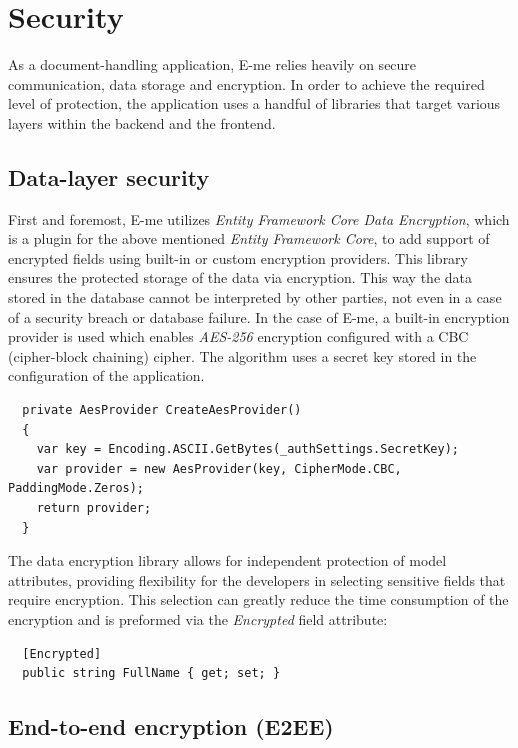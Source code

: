 \section{Security}

As a document-handling application, E-me relies heavily on secure communication, data storage and encryption.
In order to achieve the required level of protection, the application uses a handful of libraries that target various layers within the backend and the frontend.

\subsection{Data-layer security}

First and foremost, E-me utilizes \emph{Entity Framework Core Data Encryption}, which is a plugin for the above mentioned \emph{Entity Framework Core},
 to add support of encrypted fields using built-in or custom encryption providers.
This library ensures the protected storage of the data via encryption.
This way the data stored in the database cannot be interpreted by other parties, not even in a case of a security breach or database failure.
In the case of E-me, a built-in encryption provider is used which enables \emph{AES-256} encryption configured with a CBC (cipher-block chaining) cipher.
The algorithm uses a secret key stored in the configuration of the application.

\begin{lstlisting}
  private AesProvider CreateAesProvider()
  {
	var key = Encoding.ASCII.GetBytes(_authSettings.SecretKey);
	var provider = new AesProvider(key, CipherMode.CBC,	 PaddingMode.Zeros);
	return provider;
  }
\end{lstlisting}

The data encryption library allows for independent protection of model attributes, providing flexibility for the developers in selecting sensitive fields
that require encryption. This selection can greatly reduce the time consumption of the encryption and is preformed via the \emph{Encrypted} field attribute:

\begin{lstlisting}
  [Encrypted]
  public string FullName { get; set; }
\end{lstlisting}

\subsection{End-to-end encryption (E2EE)}

